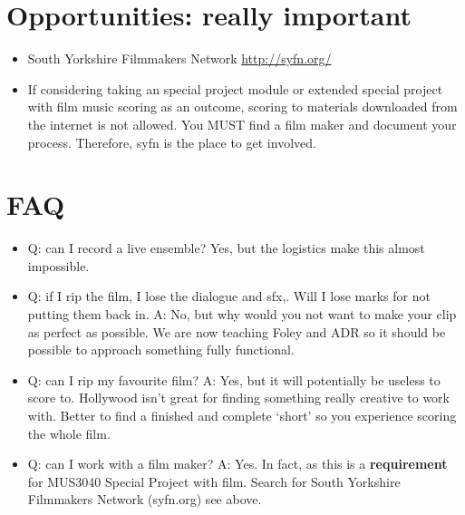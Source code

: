 \section{Opportunities: really important}
\begin{itemize}
\item South Yorkshire Filmmakers Network \url{http://syfn.org/}
\item If considering taking an special project module or extended special project with film music scoring as an outcome, scoring to materials downloaded from the internet is not allowed. You MUST find a film maker and document your process. Therefore, syfn is the place to get involved. 
\end{itemize}

\section{FAQ}
\begin{itemize}
\item Q: can I record a live ensemble? Yes, but the logistics make this almost impossible. 
\item Q: if I rip the film, I lose the dialogue and sfx,. Will I lose marks for not putting them back in. A: No, but why would you not want to make your clip as perfect as possible. We are now teaching Foley and ADR so it should be possible to approach something fully functional.
\item Q: can I rip my favourite film? A: Yes, but it will potentially be useless to score to. Hollywood isn't great for finding something really creative to work with. Better to find a finished and complete `short' so you experience scoring the whole film. 
\item Q: can I work with a film maker? A: Yes. In fact, as this is a \textbf{requirement} for MUS3040 Special Project with film. Search for South Yorkshire Filmmakers Network (syfn.org) see above.
\end{itemize}



